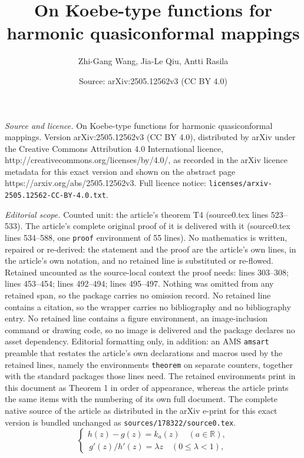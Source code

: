 \documentclass[10pt,a4paper]{amsart}
\title{On Koebe-type functions for harmonic quasiconformal mappings}
\author{Zhi-Gang Wang, Jia-Le Qiu, Antti Rasila}
\date{Source: arXiv:2505.12562v3 (CC BY 4.0)}
\newcommand{\R}{\mbox{$\mathbb{R}$}}
\begin{document}
\maketitle

\noindent\emph{Source and licence.} On Koebe-type functions for harmonic quasiconformal mappings. Version arXiv:2505.12562v3 (CC BY 4.0), distributed by arXiv under the Creative Commons Attribution 4.0 International licence, http://creativecommons.org/licenses/by/4.0/, as recorded in the arXiv licence metadata for this exact version and shown on the abstract page https://arxiv.org/abs/2505.12562v3. Full licence notice: \texttt{licenses/arxiv-2505.12562-CC-BY-4.0.txt}.\par\smallskip

\noindent\textit{Editorial scope.} Counted unit: the article's theorem T4 (source0.tex lines 523--533). The article's complete original proof of it is delivered with it (source0.tex lines 534--588, one \texttt{proof} environment of 55 lines). No mathematics is written, repaired or re-derived: the statement and the proof are the article's own lines, in the article's own notation, and no retained line is substituted or re-flowed.  Retained uncounted as the source-local context the proof needs: lines 303--308; lines 453--454; lines 492--494; lines 495--497.  Nothing was omitted from any retained span, so the package carries no omission record.  No retained line contains a citation, so the wrapper carries no bibliography and no bibliography entry.  No retained line contains a figure environment, an image-inclusion command or drawing code, so no image is delivered and the package declares no asset dependency.  Editorial formatting only, in addition: an AMS \texttt{amsart} preamble that restates the article's own declarations and macros used by the retained lines, namely the environments \texttt{theorem} on separate counters, together with the standard packages those lines need.  The retained environments print in this document as Theorem 1 in order of appearance, whereas the article prints the same items with the numbering of its own full document.  The complete native source of the article as distributed in the arXiv e-print for this exact version is bundled unchanged as \texttt{sources/178322/source0.tex}.
\begin{equation}\label{1}
  \begin{cases}
      h(z)-g(z)=k_a(z)\quad(a\in\R),\\
     \,{g'(z)}/{h'(z)}=\lambda z\quad(0\leq\lambda<1),
  \end{cases}  
\end{equation}
\end{document}
